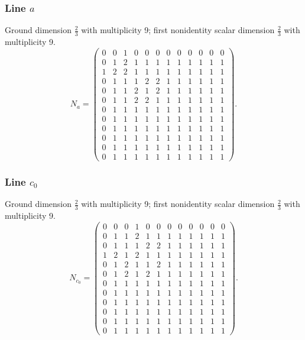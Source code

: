 \subsubsection*{Line $a$}
\noindent Ground dimension $\frac{2}{3}$ with multiplicity 9; first nonidentity scalar dimension $\frac{2}{3}$ with multiplicity 9.
\[\renewcommand{\arraystretch}{0.93}N_{a}=\left(\begin{array}{rrrrrrrrrrrr}
0&0&1&0&0&0&0&0&0&0&0&0\\
0&1&2&1&1&1&1&1&1&1&1&1\\
1&2&2&1&1&1&1&1&1&1&1&1\\
0&1&1&1&2&2&1&1&1&1&1&1\\
0&1&1&2&1&2&1&1&1&1&1&1\\
0&1&1&2&2&1&1&1&1&1&1&1\\
0&1&1&1&1&1&1&1&1&1&1&1\\
0&1&1&1&1&1&1&1&1&1&1&1\\
0&1&1&1&1&1&1&1&1&1&1&1\\
0&1&1&1&1&1&1&1&1&1&1&1\\
0&1&1&1&1&1&1&1&1&1&1&1\\
0&1&1&1&1&1&1&1&1&1&1&1
\end{array}\right).\]
\subsubsection*{Line $c_{0}$}
\noindent Ground dimension $\frac{2}{3}$ with multiplicity 9; first nonidentity scalar dimension $\frac{2}{3}$ with multiplicity 9.
\[\renewcommand{\arraystretch}{0.93}N_{c_{0}}=\left(\begin{array}{rrrrrrrrrrrr}
0&0&0&1&0&0&0&0&0&0&0&0\\
0&1&1&2&1&1&1&1&1&1&1&1\\
0&1&1&1&2&2&1&1&1&1&1&1\\
1&2&1&2&1&1&1&1&1&1&1&1\\
0&1&2&1&1&2&1&1&1&1&1&1\\
0&1&2&1&2&1&1&1&1&1&1&1\\
0&1&1&1&1&1&1&1&1&1&1&1\\
0&1&1&1&1&1&1&1&1&1&1&1\\
0&1&1&1&1&1&1&1&1&1&1&1\\
0&1&1&1&1&1&1&1&1&1&1&1\\
0&1&1&1&1&1&1&1&1&1&1&1\\
0&1&1&1&1&1&1&1&1&1&1&1
\end{array}\right).\]
